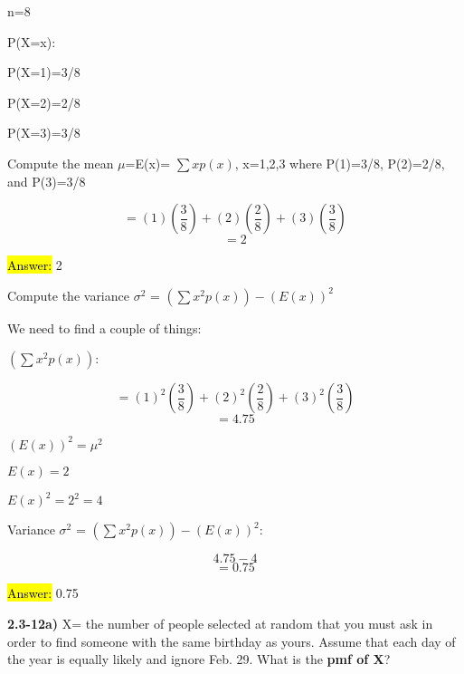 \documentclass{article}
\begin{document}
\vspace{2mm}

n=8
\vspace{2mm}

P(X=x):
\vspace{2mm}

P(X=1)=3/8

\vspace{2mm}

P(X=2)=2/8

\vspace{2mm}

P(X=3)=3/8

\vspace{2mm}

Compute the mean $\mu$=E(x)= $\sum x p(x) $, x=1,2,3 where P(1)=3/8, P(2)=2/8, and P(3)=3/8

$$=(1)(\frac{3}{8}) + (2)(\frac{2}{8}) +  (3)(\frac{3}{8})$$
$$=2$$

\vspace{2mm}

\hl{Answer:} 2


Compute the variance $\sigma^{2}$ = $(\sum x^{2} p(x)) - (E(x))^{2} $

\vspace{2mm}

We need to find a couple of things:

$(\sum x^{2} p(x))$:

$$=(1)^{2}(\frac{3}{8}) + (2)^{2}(\frac{2}{8}) +  (3)^{2}(\frac{3}{8})$$
$$=4.75$$


$(E(x))^{2} = \mu^{2}$

\vspace{2mm}

$E(x)=2$

\vspace{2mm}

$E(x)^{2}=2^{2}=4$

\vspace{2mm}

Variance $\sigma^{2}$ = $(\sum x^{2} p(x)) - (E(x))^{2} $:

$$4.75-4$$
$$=0.75$$

\vspace{2mm}

\hl{Answer:} 0.75





\newpage
\textbf{2.3-12a)} X= the number of people selected at random that you must ask in order to find someone with the same birthday as yours. Assume that each day of the year is equally likely and ignore Feb. 29. What is the \textbf{pmf of X}?
\end{document}
